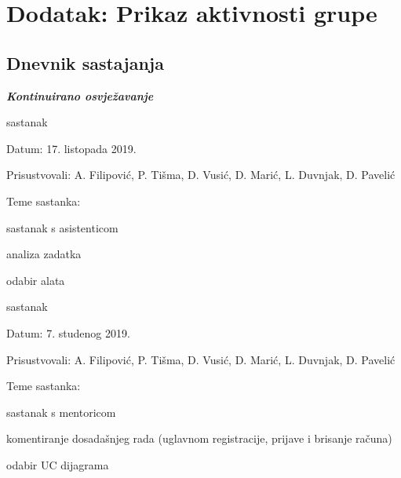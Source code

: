 \chapter*{Dodatak: Prikaz aktivnosti grupe}
		
		\section*{Dnevnik sastajanja}
		
		\textbf{\textit{Kontinuirano osvježavanje}}\\
		
		\begin{packed_enum}
			\item  sastanak
			
			\item[] \begin{packed_item}
				\item Datum: 17. listopada 2019.
				\item Prisustvovali: A. Filipović, P. Tišma, D. Vusić, D. Marić, L. Duvnjak, D. Pavelić
				\item Teme sastanka:
				\begin{packed_item}
					\item  sastanak s asistenticom 
					\item  analiza zadatka
					\item  odabir alata
				\end{packed_item}
			\end{packed_item}
			
			\item  sastanak
			\item[] \begin{packed_item}
				\item Datum: 7. studenog 2019.
				\item Prisustvovali: A. Filipović, P. Tišma, D. Vusić, D. Marić, L. Duvnjak, D. Pavelić
				\item Teme sastanka:
				\begin{packed_item}
					\item  sastanak s mentoricom
					\item  komentiranje dosadašnjeg rada (uglavnom registracije, prijave i brisanje računa)
					\item  odabir UC dijagrama
				\end{packed_item}
			\end{packed_item}
		

\end{packed_enum}
